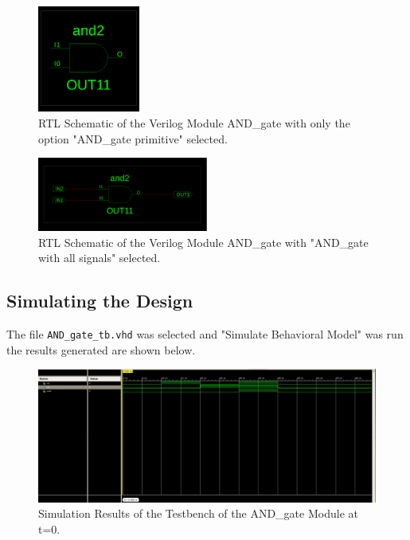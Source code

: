 \documentclass{article}
\begin{document}
\begin{figure}[H] %
    \centering
    \includegraphics[width=0.3\textwidth]{ANDGATEPRIMITIVE1.png} %
    \caption{RTL Schematic of the Verilog Module AND\_gate with only the option "AND\_gate primitive" selected.} %
    \label{fig:and_gate_primitive} %
\end{figure}

\begin{figure}[H] %
    \centering
    \includegraphics[width=0.5\textwidth]{ANDGATEWITHSIGNALS.png} %
    \caption{RTL Schematic of the Verilog Module AND\_gate with "AND\_gate with all signals" selected.} %
    \label{fig:and_gate_with_signals} %
\end{figure}

\subsection*{Simulating the Design}

The file \verb|AND_gate_tb.vhd| was selected and "Simulate Behavioral Model" was run the results generated are shown below.

\begin{figure}[H]
    \centering
    \includegraphics[width=\textwidth]{simt_0.png}
    \caption{Simulation Results of the Testbench of the AND\_gate Module at t=0.}
    \label{fig:simulation0}
\end{figure}
\end{document}
